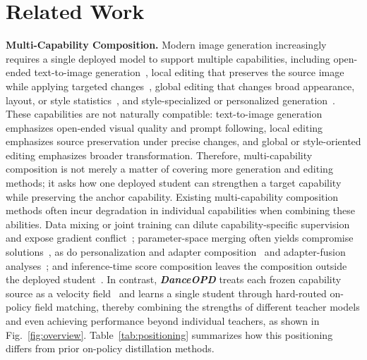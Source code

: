 \documentclass{llmxive}
\providecommand{\name}{\textsl{\textbf{DanceOPD}}\xspace}
\begin{document}
\section{Related Work}
\label{sec:related}

\noindent\textbf{Multi-Capability Composition.}
Modern image generation increasingly requires a single deployed model to support multiple capabilities, including open-ended text-to-image generation~\cite{rombach2022high,peebles2023scalable,cai2025z}, local editing that preserves the source image while applying targeted changes~\cite{brooks2023instructpix2pix,yu2025anyedit,bai2024humanedit}, global editing that changes broad appearance, layout, or style statistics~\cite{chow2025editmgt,chow2026editmgt_workshop}, and style-specialized or personalized generation~\cite{gal2022image,ruiz2023dreambooth,shah2024ziplora}. These capabilities are not naturally compatible: text-to-image generation emphasizes open-ended visual quality and prompt following, local editing emphasizes source preservation under precise changes, and global or style-oriented editing emphasizes broader transformation. Therefore, multi-capability composition is not merely a matter of covering more generation and editing methods; it asks how one deployed student can strengthen a target capability while preserving the anchor capability.
Existing multi-capability composition methods often incur degradation in individual capabilities when combining these abilities. Data mixing or joint training can dilute capability-specific supervision and expose gradient conflict~\cite{chen2018gradnorm,sener2018multi}; parameter-space merging often yields compromise solutions~\cite{yadav2023ties,yang2024adamerging}, as do personalization and adapter composition~\cite{kumari2023multi,shah2024ziplora} and adapter-fusion analyses~\cite{mahabadi2021parameter,chen2025empirical}; and inference-time score composition leaves the composition outside the deployed student~\cite{liu2022compositional,bar2023multidiffusion}. In contrast, \name{} treats each frozen capability source as a velocity field~\cite{lipman2022flow,liu2022flow} and learns a single student through hard-routed on-policy field matching, thereby combining the strengths of different teacher models and even achieving performance beyond individual teachers, as shown in Fig.~\ref{fig:overview}. Table~\ref{tab:positioning} summarizes how this positioning differs from prior on-policy distillation methods.
\end{document}
